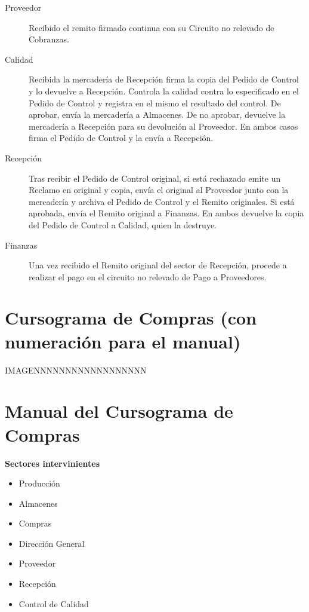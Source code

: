 \begin{description}
\item [Proveedor] Recibido el remito firmado continua con su Circuito no relevado de Cobranzas.
\item [Calidad] Recibida la mercadería de Recepción firma la copia del Pedido de Control y lo devuelve a Recepción. Controla la calidad contra lo especificado en el Pedido de Control y registra en el mismo el resultado del control. De aprobar, envía la mercadería a Almacenes. De no aprobar, devuelve la mercadería a Recepción para su devolución al Proveedor. En ambos casos firma el Pedido de Control y la envía a Recepción.
\item [Recepción] Tras recibir el Pedido de Control original, si está rechazado emite un Reclamo en original y copia, envía el original al Proveedor junto con la mercadería y archiva el Pedido de Control y el Remito originales. Si está aprobada, envía el Remito original a Finanzas. En ambos devuelve la copia del Pedido de Control a Calidad, quien la destruye.
\item [Finanzas] Una vez recibido el Remito original del sector de Recepción, procede a realizar el pago en el circuito no relevado de Pago a Proveedores.
\end{description}


\pagebreak
\section{Cursograma de Compras (con numeración para el manual)}
IMAGENNNNNNNNNNNNNNNNNN

\pagebreak
\section{Manual del Cursograma de Compras}
\begin{center}\textbf{Sectores intervinientes}\end{center}
\begin{itemize}
  \item Producci\'on
  \item Almacenes
  \item Compras
  \item Direcci\'on General
  \item Proveedor
  \item Recepci\'on
  \item Control de Calidad
\end{itemize}

